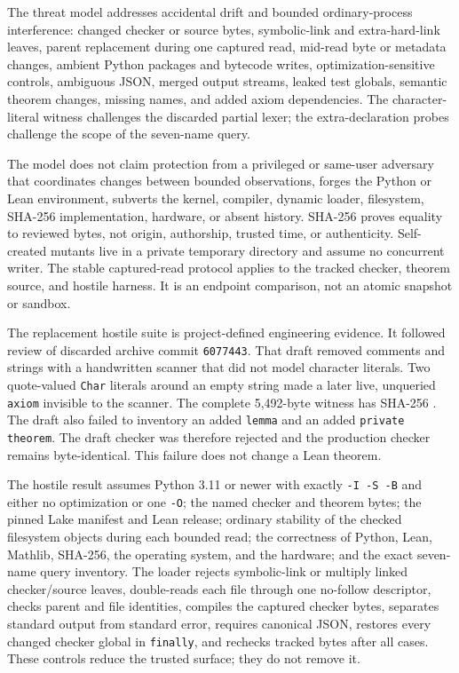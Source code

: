 \documentclass[11pt]{article}
\theoremstyle{definition}
\begin{document}
The threat model addresses accidental drift and bounded ordinary-process interference: changed
checker or source bytes, symbolic-link and extra-hard-link leaves, parent replacement during one
captured read, mid-read byte or metadata changes, ambient Python packages and bytecode writes,
optimization-sensitive controls, ambiguous JSON, merged output streams, leaked test globals,
semantic theorem changes, missing names, and added axiom dependencies.  The character-literal
witness challenges the discarded partial lexer; the extra-declaration probes challenge the scope
of the seven-name query.

The model does not claim protection from a privileged or same-user adversary that coordinates
changes between bounded observations, forges the Python or Lean environment, subverts the kernel,
compiler, dynamic loader, filesystem, SHA-256 implementation, hardware, or absent history.
SHA-256 proves equality to reviewed bytes, not origin, authorship, trusted time, or authenticity.
Self-created mutants live in a private temporary directory and assume no concurrent writer.  The
stable captured-read protocol applies to the tracked checker, theorem source, and hostile harness.
It is an endpoint comparison, not an atomic snapshot or sandbox.

The replacement hostile suite is project-defined engineering evidence.  It followed review of
discarded archive commit \texttt{6077443}.  That draft removed comments and strings with a
handwritten scanner that did not model character literals.  Two quote-valued \texttt{Char}
literals around an empty string made a later live, unqueried \texttt{axiom} invisible to the
scanner.  The complete 5,492-byte witness has SHA-256
.
The draft also failed to inventory an added \texttt{lemma} and an added \texttt{private theorem}.
The draft checker was therefore rejected and the production checker remains byte-identical.  This
failure does not change a Lean theorem.

The hostile result assumes Python 3.11 or newer with exactly \texttt{-I -S -B} and either no
optimization or one \texttt{-O}; the named checker and theorem bytes; the pinned Lake manifest and
Lean release; ordinary stability of the checked filesystem objects during each bounded read; the
correctness of Python, Lean, Mathlib, SHA-256, the operating system, and the hardware; and the exact
seven-name query inventory.  The loader rejects symbolic-link or multiply linked checker/source
leaves, double-reads each file through one no-follow descriptor, checks parent and file identities,
compiles the captured checker bytes, separates standard output from standard error, requires
canonical JSON, restores every changed checker global in \texttt{finally}, and rechecks tracked
bytes after all cases.  These controls reduce the trusted surface; they do not remove it.
\end{document}
